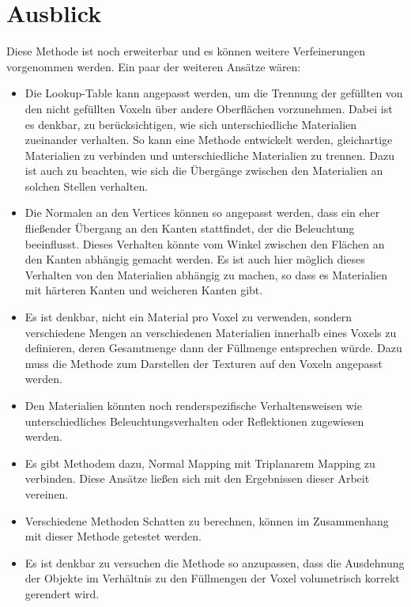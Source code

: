 
\section{Ausblick}
\label{sec:ausblick}
Diese Methode ist noch erweiterbar und es können weitere Verfeinerungen vorgenommen werden. Ein paar der weiteren Ansätze wären:
\begin{itemize}
\item Die Lookup-Table kann angepasst werden, um die Trennung der gefüllten von den nicht gefüllten Voxeln über andere Oberflächen vorzunehmen. Dabei ist es denkbar, zu berücksichtigen, wie sich unterschiedliche Materialien zueinander verhalten. So kann eine Methode entwickelt werden, gleichartige Materialien zu verbinden und unterschiedliche Materialien zu trennen. Dazu ist auch zu beachten, wie sich die Übergänge zwischen den Materialien an solchen Stellen verhalten.
\item Die Normalen an den Vertices können  so angepasst werden, dass ein eher fließender Übergang an den Kanten stattfindet, der die Beleuchtung beeinflusst. Dieses Verhalten könnte vom Winkel zwischen den Flächen an den Kanten abhängig gemacht werden. Es ist auch hier möglich dieses Verhalten von den Materialien abhängig zu machen, so dass es Materialien mit härteren Kanten und weicheren Kanten gibt.
\item Es ist denkbar, nicht ein Material pro Voxel zu verwenden, sondern verschiedene Mengen an verschiedenen Materialien innerhalb eines Voxels zu definieren, deren Gesamtmenge dann der Füllmenge entsprechen würde. Dazu muss die Methode zum Darstellen der Texturen auf den Voxeln angepasst werden. \cite{rvmm}
\item Den Materialien könnten noch renderspezifische Verhaltensweisen wie unterschiedliches Beleuchtungsverhalten oder Reflektionen zugewiesen werden.
\item Es gibt Methodem dazu, Normal Mapping mit Triplanarem Mapping zu verbinden. Diese Ansätze ließen sich mit den Ergebnissen dieser Arbeit vereinen. \cite{nmfts}
\item Verschiedene Methoden Schatten zu berechnen, können im Zusammenhang mit dieser Methode getestet werden.
\item Es ist denkbar zu versuchen die Methode so anzupassen, dass die Ausdehnung der Objekte im Verhältnis zu den Füllmengen der Voxel volumetrisch korrekt gerendert wird.
\end{itemize}